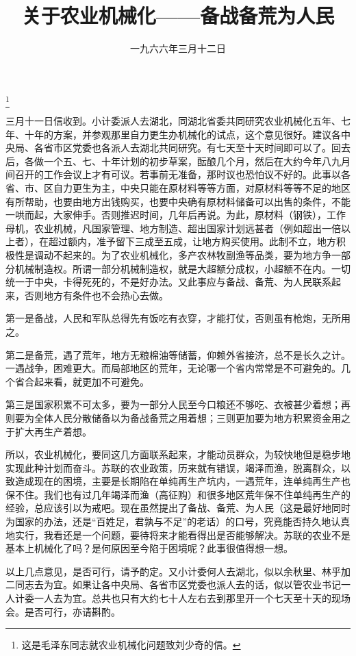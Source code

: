 
\title{关于农业机械化——备战备荒为人民}
\date{一九六六年三月十二日}
\thanks{这是毛泽东同志就农业机械化问题致刘少奇的信。}
\maketitle



三月十一日信收到。小计委派人去湖北，同湖北省委共同研究农业机械化五年、七年、十年的方案，并参观那里自力更生办机械化的试点，这个意见很好。建议各中央局、各省市区党委也各派人去湖北共同研究。有七天至十天时间即可以了。回去后，各做一个五、七、十年计划的初步草案，酝酿几个月，然后在大约今年八九月间召开的工作会议上才有可议。若事前无准备，那时议也恐怕议不好的。此事以各省、市、区自力更生为主，中央只能在原材料等等方面，对原材料等等不足的地区有所帮助，也要由地方出钱购买，也要中央确有原材料储备可以出售的条件，不能一哄而起，大家伸手。否则推迟时间，几年后再说。为此，原材料（钢铁），工作母机，农业机械，凡国家管理、地方制造、超出国家计划远甚者（例如超出一倍以上者），在超过额内，准予留下三成至五成，让地方购买使用。此制不立，地方积极性是调动不起来的。为了农业机械化，多产农林牧副渔等品类，要为地方争一部分机械制造权。所谓一部分机械制造权，就是大超额分成权，小超额不在内。一切统一于中央，卡得死死的，不是好办法。又此事应与备战、备荒、为人民联系起来，否则地方有条件也不会热心去做。

第一是备战，人民和军队总得先有饭吃有衣穿，才能打仗，否则虽有枪炮，无所用之。

第二是备荒，遇了荒年，地方无粮棉油等储蓄，仰赖外省接济，总不是长久之计。一遇战争，困难更大。而局部地区的荒年，无论哪一个省内常常是不可避免的。几个省合起来看，就更加不可避免。

第三是国家积累不可太多，要为一部分人民至今口粮还不够吃、衣被甚少着想；再则要为全体人民分散储备以为备战备荒之用着想；三则更加要为地方积累资金用之于扩大再生产着想。

所以，农业机械化，要同这几方面联系起来，才能动员群众，为较快地但是稳步地实现此种计划而奋斗。苏联的农业政策，历来就有错误，竭泽而渔，脱离群众，以致造成现在的困境，主要是长期陷在单纯再生产坑内，一遇荒年，连单纯再生产也保不住。我们也有过几年竭泽而渔（高征购）和很多地区荒年保不住单纯再生产的经验，总应该引以为戒吧。现在虽然提出了备战、备荒、为人民（这是最好地同时为国家的办法，还是“百姓足，君孰与不足”的老话）的口号，究竟能否持久地认真地实行，我看还是一个问题，要待将来才能看得出是否能够解决。苏联的农业不是基本上机械化了吗？是何原因至今陷于困境呢？此事很值得想一想。

以上几点意见，是否可行，请予酌定。又小计委何人去湖北，似以余秋里、林乎加二同志去为宜。如果让各中央局、各省市区党委也派人去的话，似以管农业书记一人计委一人去为宜。总共也只有大约七十人左右去到那里开一个七天至十天的现场会。是否可行，亦请斟酌。

